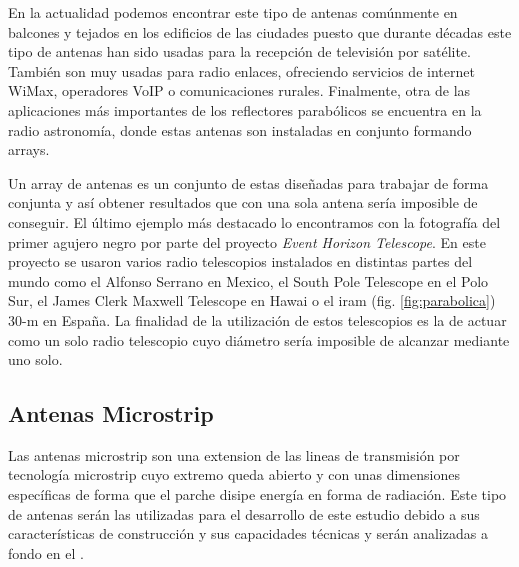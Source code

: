 \par En la actualidad podemos encontrar este tipo de antenas comúnmente en balcones y tejados en los edificios de las ciudades puesto que durante décadas este tipo de antenas han sido usadas para la recepción de televisión por satélite. También son muy usadas para radio enlaces, ofreciendo servicios de internet WiMax, operadores VoIP o comunicaciones rurales. Finalmente, otra de las aplicaciones más importantes de los reflectores parabólicos se encuentra en la radio astronomía, donde estas antenas son instaladas en conjunto formando arrays. 
\\
\par Un array de antenas es un conjunto de estas diseñadas para trabajar de forma conjunta y así obtener resultados que con una sola antena sería imposible de conseguir. El último ejemplo más destacado lo encontramos con la fotografía del primer agujero negro por parte del proyecto \textit{Event Horizon Telescope}. En este proyecto se usaron varios radio telescopios instalados en distintas partes del mundo como el Alfonso Serrano en Mexico, el South Pole Telescope en el Polo Sur, el James Clerk Maxwell Telescope en Hawai o el \gls{iram} (fig. \ref{fig:parabolica}) 30-m en España. La finalidad de la utilización de estos telescopios es la de actuar como un solo radio telescopio cuyo diámetro sería imposible de alcanzar mediante uno solo.

\subsection{Antenas Microstrip}

\par Las antenas microstrip son una extension de las lineas de transmisión por tecnología microstrip cuyo extremo queda abierto y con unas dimensiones específicas de forma que el parche disipe energía en forma de radiación. Este tipo de antenas serán las utilizadas para el desarrollo de este estudio debido a sus características de construcción y sus capacidades técnicas y serán analizadas a fondo en el . 


